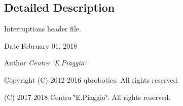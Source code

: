 \subsection{Detailed Description}
Interruptions header file. 

\begin{DoxyDate}{Date}
February 01, 2018 
\end{DoxyDate}
\begin{DoxyAuthor}{Author}
{\itshape Centro \char`\"{}\+E.\+Piaggio\char`\"{}} 
\end{DoxyAuthor}
\begin{DoxyCopyright}{Copyright}
(C) 2012-\/2016 qbrobotics. All rights reserved. 

(C) 2017-\/2018 Centro \char`\"{}\+E.\+Piaggio\char`\"{}. All rights reserved. 
\end{DoxyCopyright}
